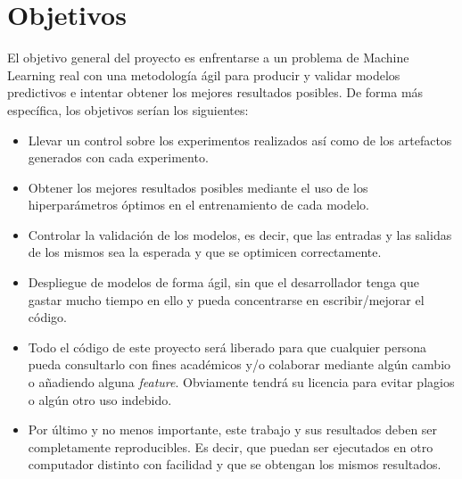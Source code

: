 \chapter{Objetivos}

El objetivo general del proyecto es enfrentarse a un problema de Machine Learning real con una metodología ágil para producir y validar modelos predictivos e intentar obtener los mejores resultados posibles. De forma más específica, los objetivos serían los siguientes:

\begin{itemize}
	\item Llevar un control sobre los experimentos realizados así como de los artefactos generados con cada experimento.
	\item Obtener los mejores resultados posibles mediante el uso de los hiperparámetros óptimos en el entrenamiento de cada modelo.
	\item Controlar la validación de los modelos, es decir, que las entradas y las salidas de los mismos sea la esperada y que se optimicen correctamente.
	\item Despliegue de modelos de forma ágil, sin que el desarrollador tenga que gastar mucho tiempo en ello y pueda concentrarse en escribir/mejorar el código.
	\item Todo el código de este proyecto será liberado para que cualquier persona pueda consultarlo con fines académicos y/o colaborar mediante algún cambio o añadiendo alguna \textit{feature}. Obviamente tendrá su licencia para evitar plagios o algún otro uso indebido.
	\item Por último y no menos importante, este trabajo y sus resultados deben ser completamente reproducibles. Es decir, que puedan ser ejecutados en otro computador distinto con facilidad y que se obtengan los mismos resultados.
\end{itemize}